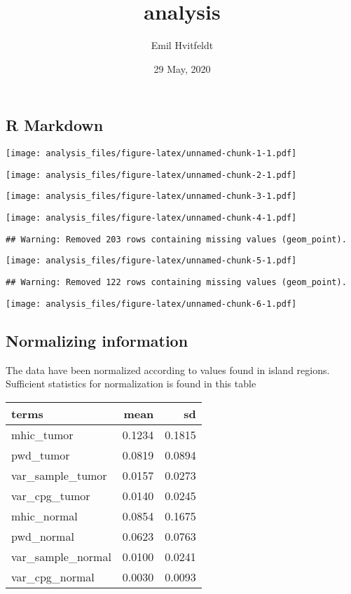 \documentclass[
]{article}
\title{analysis}
\author{Emil Hvitfeldt}
\date{29 May, 2020}
\begin{document}
\maketitle

\hypertarget{r-markdown}{%
\subsection{R Markdown}\label{r-markdown}}

\texttt{[image: analysis\_files/figure-latex/unnamed-chunk-1-1.pdf]}

\texttt{[image: analysis\_files/figure-latex/unnamed-chunk-2-1.pdf]}

\texttt{[image: analysis\_files/figure-latex/unnamed-chunk-3-1.pdf]}

\texttt{[image: analysis\_files/figure-latex/unnamed-chunk-4-1.pdf]}

\begin{verbatim}
## Warning: Removed 203 rows containing missing values (geom_point).
\end{verbatim}

\texttt{[image: analysis\_files/figure-latex/unnamed-chunk-5-1.pdf]}

\begin{verbatim}
## Warning: Removed 122 rows containing missing values (geom_point).
\end{verbatim}

\texttt{[image: analysis\_files/figure-latex/unnamed-chunk-6-1.pdf]}

\hypertarget{normalizing-information}{%
\subsection{Normalizing information}\label{normalizing-information}}

The data have been normalized according to values found in island
regions. Sufficient statistics for normalization is found in this table

\begin{longtable}[]{@{}lrr@{}}
\toprule
terms & mean & sd\tabularnewline
\midrule
\endhead
mhic\_tumor & 0.1234 & 0.1815\tabularnewline
pwd\_tumor & 0.0819 & 0.0894\tabularnewline
var\_sample\_tumor & 0.0157 & 0.0273\tabularnewline
var\_cpg\_tumor & 0.0140 & 0.0245\tabularnewline
mhic\_normal & 0.0854 & 0.1675\tabularnewline
pwd\_normal & 0.0623 & 0.0763\tabularnewline
var\_sample\_normal & 0.0100 & 0.0241\tabularnewline
var\_cpg\_normal & 0.0030 & 0.0093\tabularnewline
\bottomrule
\end{longtable}
\end{document}

